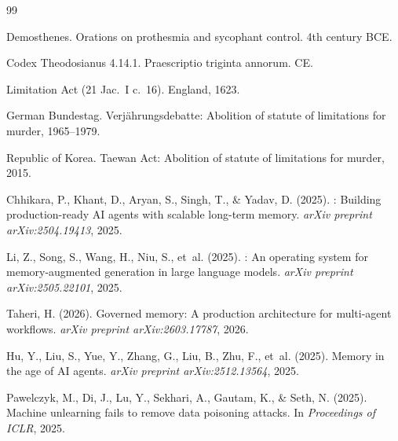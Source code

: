 \documentclass[12pt]{article}
\begin{document}

\begin{thebibliography}{99}


Demosthenes.
\newblock Orations on prothesmia and sycophant control.
\newblock 4th century BCE.

{Codex Theodosianus} 4.14.1.
\newblock Praescriptio triginta annorum.
 CE.

{Limitation Act} (21 Jac.~I c.~16).
\newblock England, 1623.

{German Bundestag}.
\newblock Verj\"{a}hrungsdebatte: Abolition of statute of limitations for murder, 1965--1979.

{Republic of Korea}.
\newblock Taewan Act: Abolition of statute of limitations for murder, 2015.


Chhikara, P., Khant, D., Aryan, S., Singh, T., \& Yadav, D. (2025).
: Building production-ready {AI} agents with scalable long-term memory.
\newblock \emph{arXiv preprint arXiv:2504.19413}, 2025.

Li, Z., Song, S., Wang, H., Niu, S., et~al. (2025).
: An operating system for memory-augmented generation in large language models.
\newblock \emph{arXiv preprint arXiv:2505.22101}, 2025.

Taheri, H. (2026).
\newblock Governed memory: A production architecture for multi-agent workflows.
\newblock \emph{arXiv preprint arXiv:2603.17787}, 2026.

Hu, Y., Liu, S., Yue, Y., Zhang, G., Liu, B., Zhu, F., et~al. (2025).
\newblock Memory in the age of {AI} agents.
\newblock \emph{arXiv preprint arXiv:2512.13564}, 2025.

Pawelczyk, M., Di, J., Lu, Y., Sekhari, A., Gautam, K., \& Seth, N. (2025).
\newblock Machine unlearning fails to remove data poisoning attacks.
\newblock In \emph{Proceedings of ICLR}, 2025.


\end{thebibliography}
\end{document}
